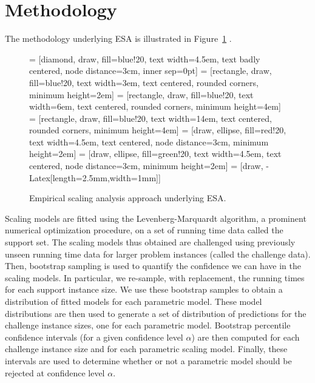 \documentclass[aic]{iosart2x}
\begin{document}


\section{Methodology}
\label{sec:method}

The methodology underlying ESA is illustrated in Figure~\ref{fig:methodology} \cite{Hoo09}.
\begin{figure}[t]
\noindent \centering{} = [diamond, draw, fill=blue!20, text width=4.5em, text badly centered, node distance=3cm, inner sep=0pt]
 = [rectangle, draw, fill=blue!20, text width=3em, text centered, rounded corners, minimum height=2em]
 = [rectangle, draw, fill=blue!20, text width=6em, text centered, rounded corners, minimum height=4em]
 = [rectangle, draw, fill=blue!20, text width=14em, text centered, rounded corners, minimum height=4em]
 = [draw, ellipse, fill=red!20, text width=4.5em, text centered, node distance=3cm, minimum height=2em]
 = [draw, ellipse, fill=green!20, text width=4.5em, text centered, node distance=3cm, minimum height=2em]
 = [draw, -{Latex[length=2.5mm,width=1mm]}]

\caption{Empirical scaling analysis approach underlying ESA.}\label{fig:methodology}
\end{figure}
Scaling models are fitted using the Levenberg-Marquardt algorithm, a prominent numerical optimization procedure,
on a set of running time data called the support set. The scaling models thus obtained are challenged using previously unseen running time data for larger problem instances (called the challenge data). Then, bootstrap sampling is used to quantify the confidence we can have in the scaling models. In particular, we re-sample, with replacement, the running times for each support instance size. We use these bootstrap samples to obtain a distribution of fitted models for each parametric model. These model distributions are then used to generate a set of distribution of predictions for the challenge instance sizes, one for each parametric model. Bootstrap percentile confidence intervals (for a given confidence level $\alpha$) are then computed for each challenge instance size and for each parametric scaling model. Finally, these intervals are used to determine whether or not a parametric model should be rejected at confidence level $\alpha$.
\end{document}
